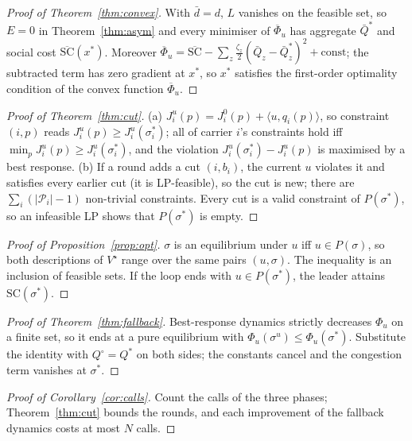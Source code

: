 \documentclass[preprint,12pt]{elsarticle}
\theoremstyle{definition}
\theoremstyle{remark}
\newcommand{\ip}[2]{\langle #1,#2\rangle}
\begin{document}
\begin{proof}[Proof of Theorem~\ref{thm:convex}]
With $\bar d=d$, $L$ vanishes on the feasible set, so $E=0$ in Theorem~\ref{thm:asym} and every minimiser of $\overline\Phi_u$ has aggregate $\bar Q^*$ and social cost $\overline{\mathrm{SC}}(x^*)$. Moreover $\overline\Phi_u=\overline{\mathrm{SC}}-\sum_z\tfrac{\zeta_z}{2}(\bar Q_z-\bar Q^*_z)^2+\text{const}$; the subtracted term has zero gradient at $x^*$, so $x^*$ satisfies the first-order optimality condition of the convex function $\overline\Phi_u$.
\end{proof}

\begin{proof}[Proof of Theorem~\ref{thm:cut}]
(a) $J^u_i(p)=J^0_i(p)+\ip{u}{q_i(p)}$, so constraint $(i,p)$ reads $J^u_i(p)\ge J^u_i(\sigma^*_i)$; all of carrier $i$'s constraints hold iff $\min_pJ^u_i(p)\ge J^u_i(\sigma^*_i)$, and the violation $J^u_i(\sigma^*_i)-J^u_i(p)$ is maximised by a best response. (b) If a round adds a cut $(i,b_i)$, the current $u$ violates it and satisfies every earlier cut (it is LP-feasible), so the cut is new; there are $\sum_i(|\mathcal P_i|-1)$ non-trivial constraints. Every cut is a valid constraint of $P(\sigma^*)$, so an infeasible LP shows that $P(\sigma^*)$ is empty.
\end{proof}

\begin{proof}[Proof of Proposition~\ref{prop:opt}]
$\sigma$ is an equilibrium under $u$ iff $u\in P(\sigma)$, so both descriptions of $V^\star$ range over the same pairs $(u,\sigma)$. The inequality is an inclusion of feasible sets. If the loop ends with $u\in P(\sigma^*)$, the leader attains $\mathrm{SC}(\sigma^*)$.
\end{proof}

\begin{proof}[Proof of Theorem~\ref{thm:fallback}]
Best-response dynamics strictly decreases $\Phi_u$ on a finite set, so it ends at a pure equilibrium with $\Phi_u(\sigma^u)\le\Phi_u(\sigma^*)$. Substitute the identity with $Q^\circ=Q^*$ on both sides; the constants cancel and the congestion term vanishes at $\sigma^*$.
\end{proof}

\begin{proof}[Proof of Corollary~\ref{cor:calls}]
Count the calls of the three phases; Theorem~\ref{thm:cut} bounds the rounds, and each improvement of the fallback dynamics costs at most $N$ calls.
\end{proof}
\end{document}
